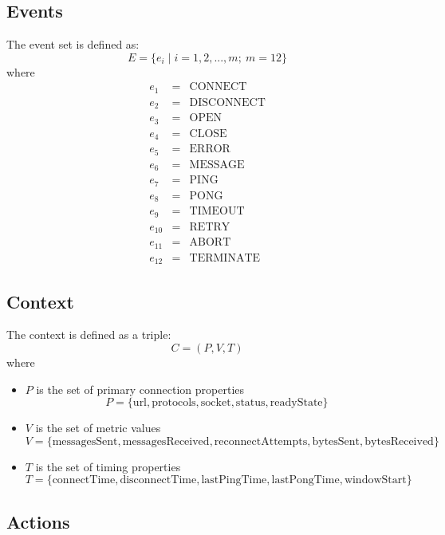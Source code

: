 \documentclass[10pt]{article}
\begin{document}
\subsection{Events}
The event set is defined as:
\[
E = \{e_i \mid i=1,2,...,m;\ m=12\}
\]
where
\begin{eqnarray*}
e_1 &=& \text{CONNECT} \\
e_2 &=& \text{DISCONNECT} \\
e_3 &=& \text{OPEN} \\
e_4 &=& \text{CLOSE} \\
e_5 &=& \text{ERROR} \\
e_6 &=& \text{MESSAGE} \\
e_7 &=& \text{PING} \\
e_8 &=& \text{PONG} \\
e_9 &=& \text{TIMEOUT} \\
e_{10} &=& \text{RETRY} \\
e_{11} &=& \text{ABORT} \\
e_{12} &=& \text{TERMINATE}
\end{eqnarray*}

\subsection{Context}
The context is defined as a triple:
$$C = (P, V, T)$$
where
\begin{itemize}[leftmargin=2em]
\item $P$ is the set of primary connection properties
  $$P = \{\text{url}, \text{protocols}, \text{socket}, \text{status}, \text{readyState}\}$$
\item $V$ is the set of metric values
  $$V = \{\text{messagesSent}, \text{messagesReceived}, \text{reconnectAttempts},
  \text{bytesSent}, \text{bytesReceived}\}$$
\item $T$ is the set of timing properties
  $$T = \{\text{connectTime}, \text{disconnectTime}, \text{lastPingTime},
  \text{lastPongTime}, \text{windowStart}\}$$
\end{itemize}

\subsection{Actions}
\end{document}
